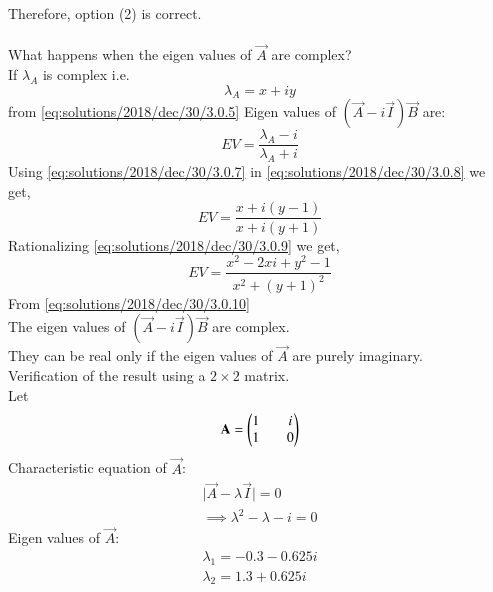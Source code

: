  Therefore, option (2) is correct.\\
 \\
 What happens when the eigen values of $\vec{A}$ are complex?\\
 If $\lambda_A$ is complex i.e.
 \begin{equation}\label{eq:solutions/2018/dec/30/3.0.7}
 \lambda_A = x + iy
 \end{equation}
 from \eqref{eq:solutions/2018/dec/30/3.0.5} Eigen values of $(\vec{A}-i\vec{I})\vec{B}$ are:\\
 \begin{equation}\label{eq:solutions/2018/dec/30/3.0.8}
 EV = \frac{\lambda_A-i}{\lambda_A+i}
 \end{equation}
 Using \eqref{eq:solutions/2018/dec/30/3.0.7} in \eqref{eq:solutions/2018/dec/30/3.0.8} we get,
 \begin{equation}\label{eq:solutions/2018/dec/30/3.0.9}
 EV = \frac{x+i(y-1)}{x+i(y+1)}
 \end{equation}
 Rationalizing \eqref{eq:solutions/2018/dec/30/3.0.9} we get,
 \begin{equation}\label{eq:solutions/2018/dec/30/3.0.10}
 EV = \frac{x^2-2xi+y^2-1}{x^2+(y+1)^2}
 \end{equation}
 From \eqref{eq:solutions/2018/dec/30/3.0.10}\\
 The eigen values of $(\vec{A}-i\vec{I})\vec{B}$ are complex.\\
 They can be real only if the eigen values of $\vec{A}$ are purely imaginary.\\
 Verification of the result using a $2\times2$ matrix.\\
 Let 
 \begin{equation}\label{eq:solutions/2018/dec/30/3.0.11}
 \mathbf{A} = \begin{pmatrix}1 && i \\ 1 && 0\end{pmatrix}
 \end{equation}
 Characteristic equation of $\vec{A}$:
 \begin{equation}\label{eq:solutions/2018/dec/30/3.0.12}
 \begin{split}
 \vert\vec{A}-\lambda\vec{I}\vert = 0\\
 \implies \lambda^2 - \lambda - i = 0
 \end{split}
 \end{equation}
 Eigen values of $\vec{A}$:
 \begin{equation}\label{eq:solutions/2018/dec/30/3.0.13}
 \begin{split}
 \lambda_1 = -0.3 - 0.625i \\
 \lambda_2 = 1.3 + 0.625i
 \end{split}
 \end{equation}
